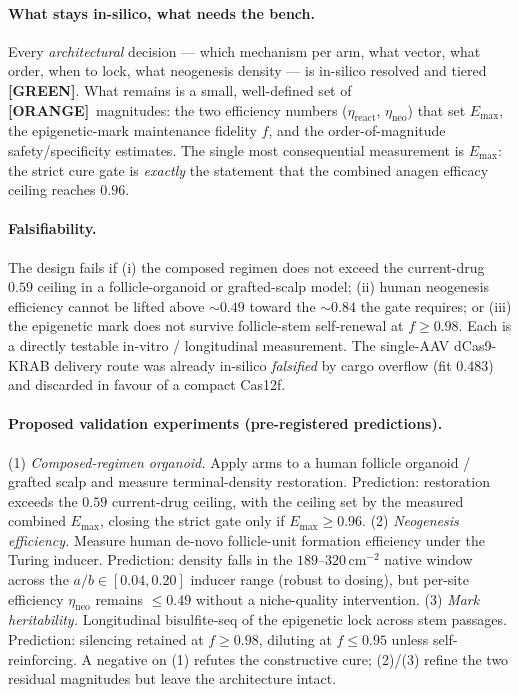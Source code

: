 \documentclass[11pt,a4paper]{article}
\newcommand{\tierbadge}[2]{\textcolor{#1}{\textbf{[#2]}}}
\providecommand{\tierGreen}{\tierbadge{green!45!black}{GREEN}}
\providecommand{\tierOrange}{\tierbadge{orange!80!black}{ORANGE}}
\newcommand{\arm}[1]{\raisebox{0.10ex}{\textcircled{\scriptsize #1}}}
\begin{document}
\paragraph{What stays in-silico, what needs the bench.} Every \emph{architectural}
decision --- which mechanism per arm, what vector, what order, when to lock, what
neogenesis density --- is in-silico resolved and tiered \tierGreen. What remains is a
small, well-defined set of \tierOrange\ magnitudes: the two efficiency numbers
($\eta_{\text{react}}$, $\eta_{\text{neo}}$) that set $E_{\max}$, the epigenetic-mark
maintenance fidelity $f$, and the order-of-magnitude safety/specificity estimates. The
single most consequential measurement is $E_{\max}$: the strict cure gate is \emph{exactly}
the statement that the combined anagen efficacy ceiling reaches $0.96$.

\paragraph{Falsifiability.} The design fails if (i) the composed regimen does not exceed
the current-drug $0.59$ ceiling in a follicle-organoid or grafted-scalp model; (ii) human
neogenesis efficiency cannot be lifted above $\sim\!0.49$ toward the $\sim\!0.84$ the gate
requires; or (iii) the epigenetic mark does not survive follicle-stem self-renewal at
$f\!\geq\!0.98$. Each is a directly testable in-vitro / longitudinal measurement. The
single-AAV dCas9-KRAB delivery route was already in-silico \emph{falsified} by cargo
overflow (fit $0.483$) and discarded in favour of a compact Cas12f.

\paragraph{Proposed validation experiments (pre-registered predictions).}
(1) \emph{Composed-regimen organoid.} Apply arms \arm{1}\arm{2}\arm{4} to a human follicle organoid /
grafted scalp and measure terminal-density restoration. Prediction: restoration exceeds
the $0.59$ current-drug ceiling, with the ceiling set by the measured combined
$E_{\max}$, closing the strict gate only if $E_{\max}\!\geq\!0.96$. (2) \emph{Neogenesis
efficiency.} Measure human de-novo follicle-unit formation efficiency under the Turing
inducer. Prediction: density falls in the $189$--$320$\,cm$^{-2}$ native window across the
$a/b\in[0.04,0.20]$ inducer range (robust to dosing), but per-site efficiency
$\eta_{\text{neo}}$ remains $\leq\!0.49$ without a niche-quality intervention. (3)
\emph{Mark heritability.} Longitudinal bisulfite-seq of the epigenetic lock across stem
passages. Prediction: silencing retained at $f\!\geq\!0.98$, diluting at $f\!\leq\!0.95$
unless self-reinforcing. A negative on (1) refutes the constructive cure; (2)/(3) refine
the two residual magnitudes but leave the architecture intact.
\end{document}

